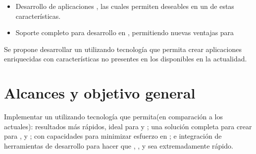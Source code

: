 		\begin{itemize}
			\item
				Desarrollo de aplicaciones \realTimeINT, \reactive las cuales permiten deseables \featuresCPT en un \frameworkPC de estas características.
			\item
				Soporte completo para desarrollo en \devicesINT \mobilesINT, permitiendo nuevas ventajas para \ecommerceCOM \cite{cook2015mobile}
		\end{itemize}



		Se propone desarrollar un \frameworkPC \freePC \openSourcePC utilizando tecnología \webINT que permita crear aplicaciones enriquecidas con características no presentes en los \frameworksPC \ecommerceCOM \freePC \openSourcePC disponibles en la actualidad.


	\section{Alcances y objetivo general}\label{cap:intro:alcances}

		Implementar un \frameworkPC \ecommerceCOM utilizando tecnología \freePC \openSourcePC que permita(en comparación a los \frameworksPC actuales):  resultados más rápidos, ideal para \prototypesCPT y \mvpSiglasCOM; una solución completa para crear \featuresCPT para \serversAS \cite{online_ecommerce_solution_requires}, \browsersINT y \devicesINT \mobilesINT; \builtINPL con capacidades \realTimeINT para minimizar esfuerzo en \developmentPC; e integración de herramientas de desarrollo para hacer que \setupCPT, \developmentPC, y \deploymentCPT sea extremadamente rápido. 


